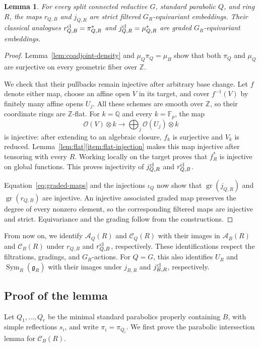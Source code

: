 \documentclass[twoside,a4paper,12pt,reqno]{amsart}
\newtheorem{lemma}[theorem]{Lemma}
\theoremstyle{remark}
\numberwithin{equation}{section}
\newcommand{\Z}{\mathbb Z}
\newcommand{\Q}{\mathbb Q}
\newcommand{\F}{\mathbb F}
\newcommand{\cO}{\mathcal O}
\newcommand{\fg}{\mathfrak g}
\newcommand{\cA}{\mathcal A}
\DeclareMathOperator{\Sym}{Sym}
\DeclareMathOperator{\gr}{gr}
\begin{document}
\begin{lemma}\label{lem:comparisons}
For every split connected reductive \(G\), standard parabolic \(Q\),
and ring \(R\), the maps \(r_{Q,B}\) and \(j_{Q,R}\) are strict
filtered \(G_R\)-equivariant embeddings.
Their classical analogues \(r^{\rm cl}_{Q,B}=\pi_{Q,R}^*\) and
\(j^{\rm cl}_{Q,R}=\mu_{Q,R}^*\) are graded
\(G_R\)-equivariant embeddings.
\end{lemma}
\begin{proof}
Lemma~\ref{lem:coadjoint-density} and
\(\mu_Q\pi_Q=\mu_B\) show that both \(\pi_Q\) and \(\mu_Q\)
are surjective on every geometric fiber over \(\Z\).

We check that their pullbacks remain injective after arbitrary base
change. Let \(f\) denote either map, choose an affine open \(V\)
in its target, and cover \(f^{-1}(V)\) by finitely many affine opens
\(U_j\). All these schemes are smooth over \(\Z\), so their
coordinate rings are \(\Z\)-flat.
For \(k=\Q\) and every \(k=\F_p\), the map
\[
\cO(V)\otimes k\longrightarrow
\bigoplus_j\cO(U_j)\otimes k
\]
is injective: after extending to an algebraic closure, \(f_k\)
is surjective and \(V_k\) is reduced.
Lemma~\ref{lem:flat}\eqref{item:flat-injection} makes this map
injective after tensoring with every \(R\).
Working locally on the target proves that \(f_R^*\) is injective
on global functions. This proves injectivity of \(j^{\rm cl}_{Q,R}\) and \(r^{\rm cl}_{Q,B}\).

Equation~\eqref{eq:graded-maps} and the injections \(\iota_Q\) now show
that \(\gr(j_{Q,R})\) and \(\gr(r_{Q,B})\) are injective.
An injective associated graded map preserves the degree of every
nonzero element, so the corresponding filtered maps are injective and strict.
Equivariance and the grading follow from the constructions.
\end{proof}

From now on, we identify \(\cA_Q(R)\) and \(\mathcal C_Q(R)\)
with their images in \(\cA_B(R)\) and \(\mathcal C_B(R)\)
under \(r_{Q,B}\) and \(r^{\rm cl}_{Q,B}\), respectively.
These identifications respect the filtrations, gradings, and \(G_R\)-actions.
For \(Q=G\), this also identifies \(U_R\) and \(\Sym_R(\fg_R)\)
with their images under \(j_{B,R}\) and \(j^{\rm cl}_{B,R}\), respectively.

\subsection{Proof of the lemma}

Let \(Q_1,\ldots,Q_r\) be the minimal standard parabolics properly
containing \(B\), with simple reflections \(s_i\), and write
\(\pi_i=\pi_{Q_i}\).
We first prove the parabolic intersection lemma for \(\mathcal C_B(R)\).
\end{document}
